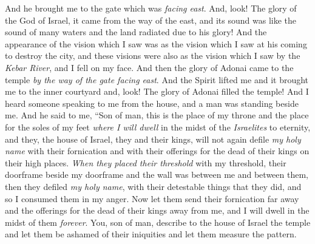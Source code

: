 \begin{biblechapter} %
 And he brought me to the gate which was \textit{facing east}.
\verse And, look! The glory of the God of Israel, it came from the way of the east, and its sound was like the sound of many waters and the land radiated due to his glory!
\verse And the appearance of the vision which I saw was as the vision which I saw at his coming to destroy the city, and these visions were also as the vision which I saw by the \textit{Kebar River}, and I fell on my face.
\verse And then the glory of Adonai came to the temple \textit{by the way of the gate facing east}.
\verse And the Spirit lifted me and it brought me to the inner courtyard and, look! The glory of Adonai filled the temple!
\verse And I heard someone speaking to me from the house, and a man was standing beside me.
\verse And he said to me, “Son of man, this is the place of my throne and the place for the soles of my feet \textit{where I will dwell} in the midst of the \textit{Israelites} to eternity, and they, the house of Israel, they and their kings, will not again defile \textit{my holy name} with their fornication and with their offerings for the dead of their kings on their high places.
\verse \textit{When they placed their threshold} with my threshold, their doorframe beside my doorframe and the wall was between me and between them, then they defiled \textit{my holy name}, with their detestable things that they did, and so I consumed them in my anger.
\verse Now let them send their fornication far away and the offerings for the dead of their kings away from me, and I will dwell in the midst of them \textit{forever}.
\verse You, son of man, describe to the house of Israel the temple and let them be ashamed of their iniquities and let them measure the pattern.

\end{biblechapter}
